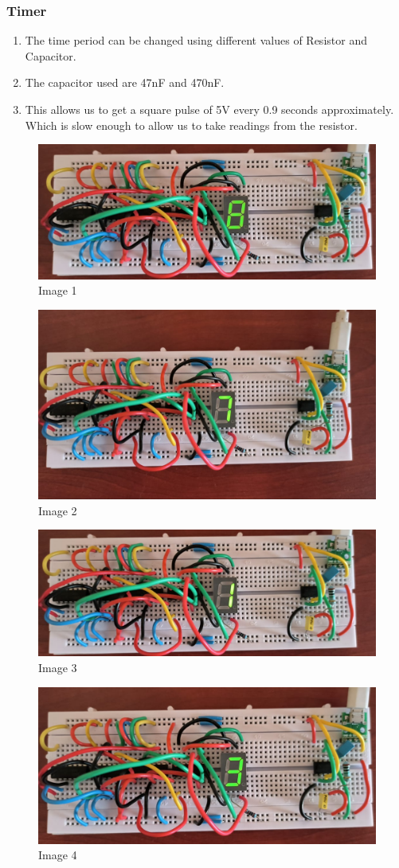 \documentclass{article}
\begin{document}
\subsubsection{Timer}
\begin{enumerate}
\item The time period can be changed using different values of Resistor and Capacitor.
\item The capacitor used are 47nF and 470nF.
\item This allows us to get a square pulse of 5V every 0.9 seconds approximately. Which is slow enough to allow us to take readings from the resistor.
\end{enumerate}
\begin{figure}[ht]
\centering
\includegraphics[width=0.7\linewidth]{Images/1.jpeg}
\caption{Image 1}
\end{figure}
\FloatBarrier
\begin{figure}[ht]
\centering
\includegraphics[width=0.7\linewidth]{Images/2.jpeg}
\caption{Image 2}
\end{figure}
\FloatBarrier
\begin{figure}[ht]
\centering
\includegraphics[width=0.7\linewidth]{Images/3.jpeg}
\caption{Image 3}
\end{figure}
\FloatBarrier
\begin{figure}[ht]
\centering
\includegraphics[width=0.7\linewidth]{Images/4.jpeg}
\caption{Image 4}
\end{figure}
\FloatBarrier
\end{document}
